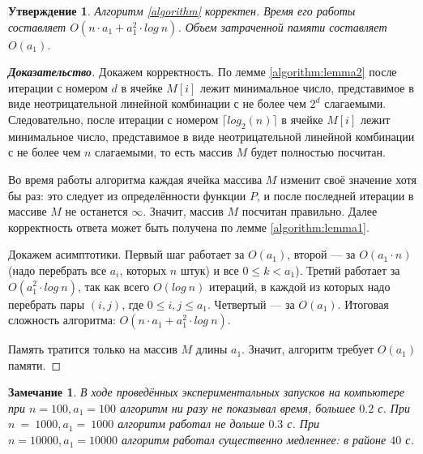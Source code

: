 \documentclass[12pt]{article}
\newtheorem{proposition}[theorem]{Утверждение}
\newtheorem{remark}[theorem]{Замечание}
\theoremstyle{definition}
\begin{document}
\begin{proposition}
Алгоритм \ref{algorithm} корректен. Время его работы составляет $O(n \cdot a_1 + a_1^2 \cdot log \ n)$. Объем затраченной памяти составляет $O(a_1)$.
\end{proposition}
\begin{proof}[\textbf{Доказательство}]
Докажем корректность. По лемме \ref{algorithm:lemma2} после итерации с номером $d$ в ячейке $M[i]$ лежит минимальное число, представимое в виде неотрицательной линейной комбинации с не более чем $2^d$ слагаемыми. Следовательно, после итерации с номером $\lceil log_2(n) \rceil$ в ячейке $M[i]$ лежит минимальное число, представимое в виде неотрицательной линейной комбинации с не более чем $n$ слагаемыми, то есть массив $M$ будет полностью посчитан.

Во время работы алгоритма каждая ячейка массива $M$ изменит своё значение хотя бы раз: это следует из определённости функции $P$, и после последней итерации в массиве $M$ не останется $\infty$. Значит, массив $M$ посчитан правильно. Далее корректность ответа может быть получена по лемме \ref{algorithm:lemma1}.

Докажем асимптотики. Первый шаг работает за $O(a_1)$, второй --- за $O(a_1 \cdot n)$ (надо перебрать все $a_i$, которых $n$ штук) и все $0 \le k < a_1$). Третий работает за $O(a_1^2 \cdot log \ n)$, так как всего $O(log \ n)$ итераций, в каждой из которых надо перебрать пары $(i, j)$, где $0 \le i, j \le a_1$. Четвертый --- за $O(a_1)$. Итоговая сложность алгоритма: $O(n \cdot a_1 + a_1^2 \cdot log \ n)$.

Память тратится только на массив $M$ длины $a_1$. Значит, алгоритм требует $O(a_1)$ памяти.
\end{proof}

\begin{remark}
В ходе проведённых экспериментальных запусков на компьютере при $n = 100, a_1 = 100$ алгоритм ни разу не показывал время, большее $0.2$ с. При $n~=~1000, a_1 =~1000$ алгоритм работал не дольше $0.3$ с. При $n = 10000, a_1 = 10000$ алгоритм работал существенно медленнее: в районе $40$ с.
\end{remark}
\end{document}
